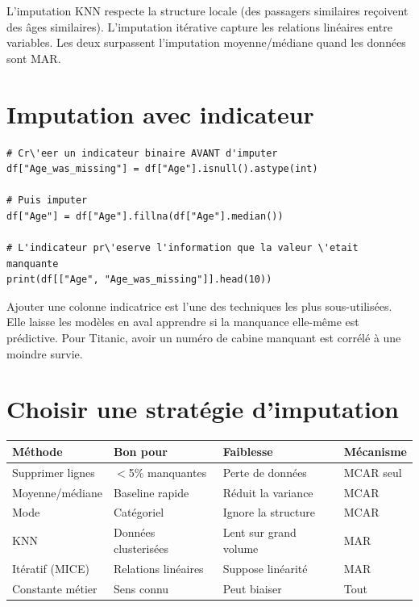 \begin{preprocesstip}
L'imputation KNN respecte la structure locale (des passagers similaires re\c{c}oivent des \^ages similaires). L'imputation it\'erative capture les relations lin\'eaires entre variables. Les deux surpassent l'imputation moyenne/m\'ediane quand les donn\'ees sont MAR.
\end{preprocesstip}

\section{Imputation avec indicateur}

\begin{verbatim}
# Cr\'eer un indicateur binaire AVANT d'imputer
df["Age_was_missing"] = df["Age"].isnull().astype(int)

# Puis imputer
df["Age"] = df["Age"].fillna(df["Age"].median())

# L'indicateur pr\'eserve l'information que la valeur \'etait manquante
print(df[["Age", "Age_was_missing"]].head(10))
\end{verbatim}

\begin{datatip}
Ajouter une colonne indicatrice est l'une des techniques les plus sous-utilis\'ees. Elle laisse les mod\`eles en aval apprendre si la manquance elle-m\^eme est pr\'edictive. Pour Titanic, avoir un num\'ero de cabine manquant est corr\'el\'e \`a une moindre survie.
\end{datatip}

\section{Choisir une strat\'egie d'imputation}

\begin{longtable}{p{3.5cm}p{3cm}p{3cm}p{3.5cm}}
\toprule
\textbf{M\'ethode} & \textbf{Bon pour} & \textbf{Faiblesse} & \textbf{M\'ecanisme} \\
\midrule
Supprimer lignes & $<$5\% manquantes & Perte de donn\'ees & MCAR seul \\
Moyenne/m\'ediane & Baseline rapide & R\'eduit la variance & MCAR \\
Mode & Cat\'egoriel & Ignore la structure & MCAR \\
KNN & Donn\'ees clusteris\'ees & Lent sur grand volume & MAR \\
It\'eratif (MICE) & Relations lin\'eaires & Suppose lin\'earit\'e & MAR \\
Constante m\'etier & Sens connu & Peut biaiser & Tout \\
\bottomrule
\end{longtable}

